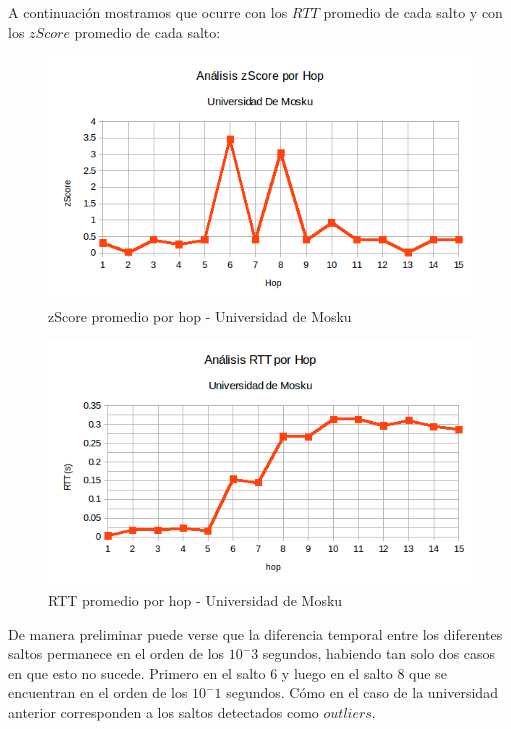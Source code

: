 A continuación mostramos que ocurre con los $RTT$ promedio de cada salto y con los $zScore$ promedio de cada salto:

\begin{figure}[H]
\centering
\includegraphics[width=1\textwidth]{graficos/zScore_rus.png}
\caption{zScore promedio por hop - Universidad de Mosku}
\label{Rus_zs}
\end{figure}

\begin{figure}[H]
\centering
\includegraphics[width=1\textwidth]{graficos/RTT_rus.png}
\caption{RTT promedio por hop - Universidad de Mosku}
\label{Rus_rtt}
\end{figure}

De manera preliminar puede verse que la diferencia temporal entre los diferentes saltos permanece en el orden de los $10^-3$ segundos, 
habiendo tan solo dos casos en que esto no sucede. Primero en el salto 6 y luego en el salto 8 que se encuentran en el orden de los $10^-1$ 
segundos. Cómo en el caso de la universidad anterior corresponden a los saltos detectados como $outliers$.\\

